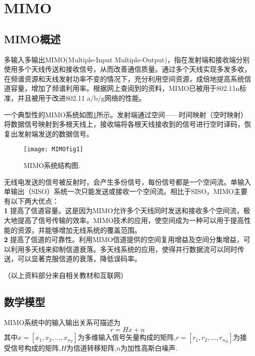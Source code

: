 \section{MIMO}
\subsection{MIMO概述}
多输入多输出MIMO(Multiple-Input Multiple-Output)，指在发射端和接收端分别使用多个天线传送和接收信号，从而改善通信质量。通过多个天线实现多发多收，在频谱资源和天线发射功率不变的情况下，充分利用空间资源，成倍地提高系统信道容量，增加了频谱利用率。根据网上查阅到的资料，MIMO已被用于802.11n标准，并且被用于改进802.11 a/b/g网络的性能。\par
一个典型性的MIMO系统如图\ref{MIMO}所示。发射端通过空间——时间映射（空时映射）将数据信号映射到多根天线上，接收端将各根天线接收到的信号进行空时译码，恢复出发射端发送的数据信号。
\begin{figure}[H]
	\centering
	\texttt{[image: MIMOfig1]}
	\caption{MIMO系统结构图.}
	\label{MIMO}
\end{figure}

无线电发送的信号被反射时，会产生多份信号，每份信号都是一个空间流。单输入单输出（SISO）系统一次只能发送或接收一个空间流。相比于SISO，MIMO主要有以下两大优点：\\
\textbf{1 }提高了信道容量。这是因为MIMO允许多个天线同时发送和接收多个空间流，极大地提高了信号传输的效率。MIMO技术的应用，使空间成为一种可以用于提高性能的资源，并能够增加无线系统的覆盖范围。\\
\textbf{2 }提高了信道的可靠性。利用MIMO信道提供的空间复用增益及空间分集增益，可以利用多天线来抑制信道衰落。多天线系统的应用，使得并行数据流可以同时传送，可以显著克服信道的衰落，降低误码率。\par
（以上资料部分来自相关教材和互联网）

\subsection{数学模型}
MIMO系统中的输入输出关系可描述为
\[
r=Hx+n
\]
其中$x=[x_1,x_2,\dots,x_{n_T}]$为多维输入信号矢量构成的矩阵,$r=[r_1,r_2,\dots,r_{n_R}]$为接受信号构成的矩阵,$H$为信道转移矩阵,$n$为加性高斯白噪声.



